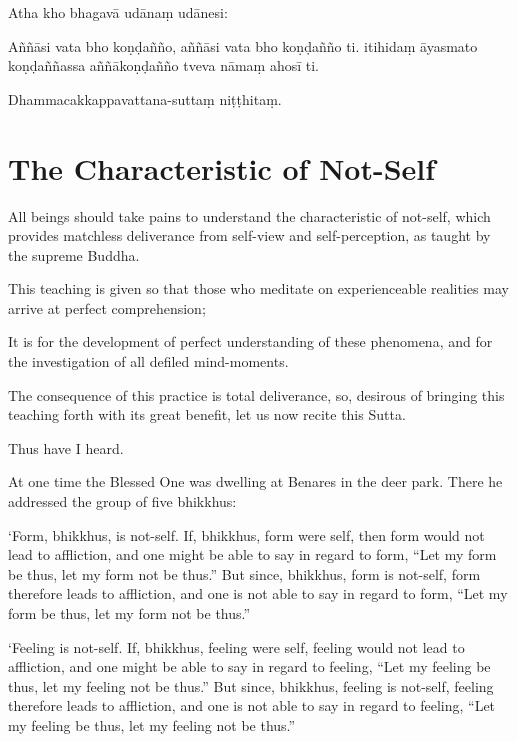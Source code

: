 Atha kho bhagavā udānaṃ udānesi:

Aññāsi vata bho koṇḍañño, aññāsi vata bho koṇḍañño ti. itihidaṃ āyasmato
koṇḍaññassa aññākoṇḍañño tveva nāmaṃ ahosī ti.

Dhammacakkappavattana-suttaṃ niṭṭhitaṃ.

\chapterTocDelegatePageNumber
\chapter{The Characteristic of Not-Self}%

\setTocDelegatedPageNumber
\englishText
\renewcommand{\englishTitle}{The Characteristic of Not-Self}

\begin{leader}

All beings should take pains to understand the characteristic of
not-self, which provides matchless deliverance from self-view and
self-perception, as taught by the supreme Buddha.

This teaching is given so that those who meditate on experienceable
realities may arrive at perfect comprehension;

It is for the development of perfect understanding of these phenomena,
and for the investigation of all defiled mind-moments.

The consequence of this practice is total deliverance, so, desirous of
bringing this teaching forth with its great benefit, let us now recite
this Sutta.

\end{leader}

Thus have I heard.

At one time the Blessed One was dwelling at Benares in the deer park.
There he addressed the group of five bhikkhus:

‘Form, bhikkhus, is not-self. If, bhikkhus, form were self, then form
would not lead to affliction, and one might be able to say in regard to
form, “Let my form be thus, let my form not be thus.” But since,
bhikkhus, form is not-self, form therefore leads to affliction, and one
is not able to say in regard to form, “Let my form be thus, let my form
not be thus.”

‘Feeling is not-self. If, bhikkhus, feeling were self, feeling would
not lead to affliction, and one might be able to say in regard to
feeling, “Let my feeling be thus, let my feeling not be thus.” But
since, bhikkhus, feeling is not-self, feeling therefore leads to
affliction, and one is not able to say in regard to feeling, “Let my
feeling be thus, let my feeling not be thus.”

